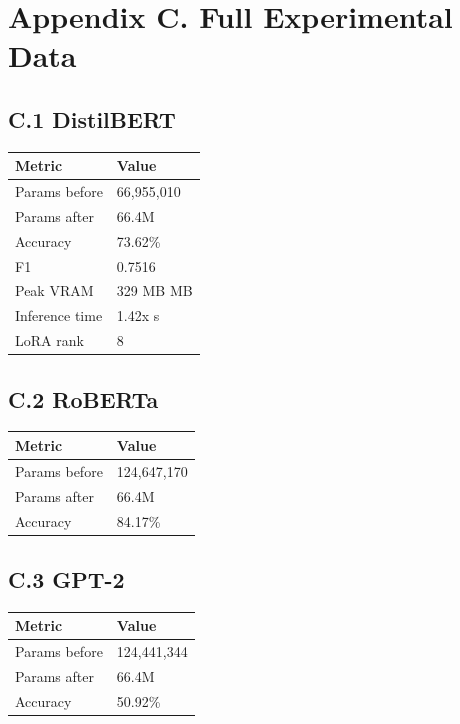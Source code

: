\section{Appendix C. Full Experimental Data}

\subsection{C.1 DistilBERT}

\begin{table}[H]
\centering
\small
\begin{tabular}{ll}
\toprule
\textbf{Metric} & \textbf{Value} \\
\midrule
Params before & 66,955,010 \\
Params after & 66.4M \\
Accuracy & 73.62\% \\
F1 & 0.7516 \\
Peak VRAM & 329 MB MB \\
Inference time & 1.42x s \\
LoRA rank & 8 \\
\bottomrule
\end{tabular}
\end{table}

\subsection{C.2 RoBERTa}

\begin{table}[H]
\centering
\small
\begin{tabular}{ll}
\toprule
\textbf{Metric} & \textbf{Value} \\
\midrule
Params before & 124,647,170 \\
Params after & 66.4M \\
Accuracy & 84.17\% \\
\bottomrule
\end{tabular}
\end{table}

\subsection{C.3 GPT-2}

\begin{table}[H]
\centering
\small
\begin{tabular}{ll}
\toprule
\textbf{Metric} & \textbf{Value} \\
\midrule
Params before & 124,441,344 \\
Params after & 66.4M \\
Accuracy & 50.92\% \\
\bottomrule
\end{tabular}
\end{table}

